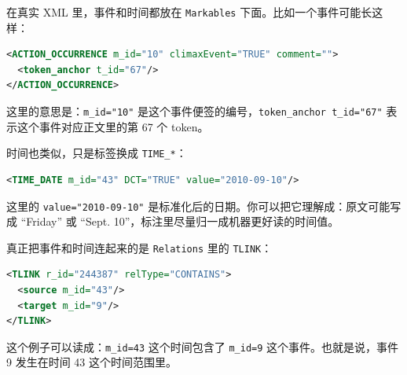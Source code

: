 \documentclass[11pt,a4paper,fontset=fandol]{ctexart}
\newcommand{\code}[1]{\texttt{#1}}
\begin{document}
\begin{center}
\end{center}

在真实 XML 里，事件和时间都放在 \code{Markables} 下面。比如一个事件可能长这样：

\begin{lstlisting}[language=XML]
<ACTION_OCCURRENCE m_id="10" climaxEvent="TRUE" comment="">
  <token_anchor t_id="67"/>
</ACTION_OCCURRENCE>
\end{lstlisting}

这里的意思是：\code{m\_id="10"} 是这个事件便签的编号，\code{token\_anchor t\_id="67"} 表示这个事件对应正文里的第 67 个 token。

时间也类似，只是标签换成 \code{TIME\_*}：

\begin{lstlisting}[language=XML]
<TIME_DATE m_id="43" DCT="TRUE" value="2010-09-10"/>
\end{lstlisting}

这里的 \code{value="2010-09-10"} 是标准化后的日期。你可以把它理解成：原文可能写成 “Friday” 或 “Sept. 10”，标注里尽量归一成机器更好读的时间值。

真正把事件和时间连起来的是 \code{Relations} 里的 \code{TLINK}：

\begin{lstlisting}[language=XML]
<TLINK r_id="244387" relType="CONTAINS">
  <source m_id="43"/>
  <target m_id="9"/>
</TLINK>
\end{lstlisting}

这个例子可以读成：\code{m\_id=43} 这个时间包含了 \code{m\_id=9} 这个事件。也就是说，事件 9 发生在时间 43 这个时间范围里。
\end{document}
